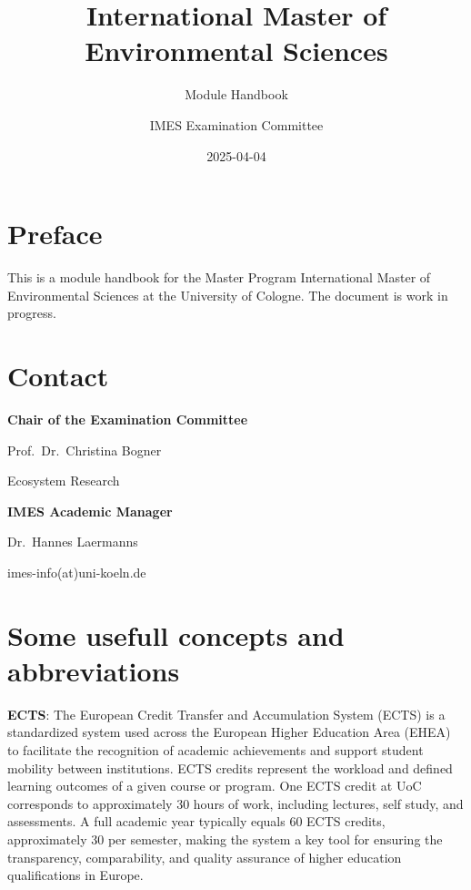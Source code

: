 \documentclass[
  letterpaper,
  10pt,
  openany]{book}
\title{International Master of Environmental Sciences}
\subtitle{Module Handbook}
\author{IMES Examination Committee}
\date{2025-04-04}
\renewcommand*\contentsname{Table of contents}
\newcommand\contentsname{Table of contents}
\begin{document}
\frontmatter
\maketitle

\renewcommand*\contentsname{Table of contents}
{
\setcounter{tocdepth}{0}
\tableofcontents
}

\mainmatter
{}

\chapter*{Preface}\label{preface}


This is a module handbook for the Master Program International Master of
Environmental Sciences at the University of Cologne. The document is
work in progress.


\chapter*{Contact}\label{contact}


\textbf{Chair of the Examination Committee}

Prof.~Dr.~Christina Bogner

Ecosystem Research

\textbf{IMES Academic Manager}

Dr.~Hannes Laermanns

imes-info(at)uni-koeln.de


\chapter*{Some usefull concepts and abbreviations}\label{sec-concepts}


\textbf{ECTS}: The European Credit Transfer and Accumulation System
(ECTS) is a standardized system used across the European Higher
Education Area (EHEA) to facilitate the recognition of academic
achievements and support student mobility between institutions. ECTS
credits represent the workload and defined learning outcomes of a given
course or program. One ECTS credit at UoC corresponds to approximately
30 hours of work, including lectures, self study, and assessments. A
full academic year typically equals 60 ECTS credits, approximately 30
per semester, making the system a key tool for ensuring the
transparency, comparability, and quality assurance of higher education
qualifications in Europe.
\end{document}
